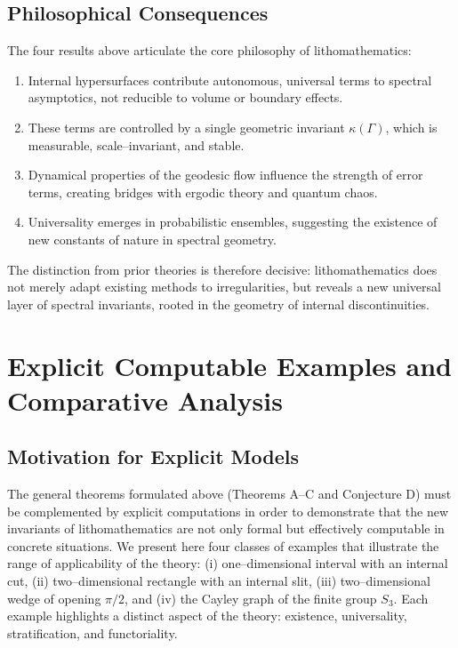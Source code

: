 \subsection{Philosophical Consequences}

The four results above articulate the core philosophy of lithomathematics:

\begin{enumerate}
\item Internal hypersurfaces contribute autonomous, universal terms to 
spectral asymptotics, not reducible to volume or boundary effects.
\item These terms are controlled by a single geometric invariant 
$\kappa(\Gamma)$, which is measurable, scale--invariant, and stable.
\item Dynamical properties of the geodesic flow influence the strength of 
error terms, creating bridges with ergodic theory and quantum chaos.
\item Universality emerges in probabilistic ensembles, suggesting the existence 
of new constants of nature in spectral geometry.
\end{enumerate}

The distinction from prior theories is therefore decisive: 
lithomathematics does not merely adapt existing methods to irregularities, 
but reveals a new universal layer of spectral invariants, 
rooted in the geometry of internal discontinuities.

\section{Explicit Computable Examples and Comparative Analysis}

\subsection{Motivation for Explicit Models}

The general theorems formulated above (Theorems A--C and Conjecture D) 
must be complemented by explicit computations in order to demonstrate 
that the new invariants of lithomathematics are not only formal 
but effectively computable in concrete situations. 
We present here four classes of examples that illustrate the range 
of applicability of the theory: (i) one--dimensional interval with an internal cut, 
(ii) two--dimensional rectangle with an internal slit, 
(iii) two--dimensional wedge of opening $\pi/2$, and (iv) 
the Cayley graph of the finite group $S_3$. 
Each example highlights a distinct aspect of the theory:
existence, universality, stratification, and functoriality. 

